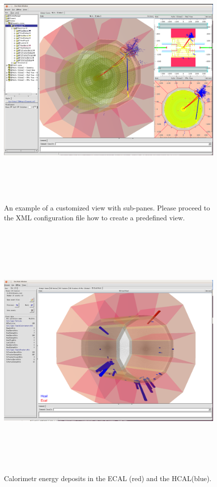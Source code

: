 \documentclass[10pt,a4paper]{article}
\begin{document}
\begin{figure}[h]
  \begin{center}
    \includegraphics[height=130mm] {DDEve_5}
    \caption{An example of a customized view with sub-panes. Please proceed 
               to the XML configuration file how to create a predefined view.}
    \label{fig:DDEve_5}
  \end{center}
\end{figure}

\newpage
\noindent
\begin{figure}[h]
  \begin{center}
    \includegraphics[height=130mm] {DDEve_7}
    \caption{Calorimetr energy deposits in the ECAL (red) and the HCAL(blue).}
    \label{fig:DDEve_5}
  \end{center}
\end{figure}
\end{document}
